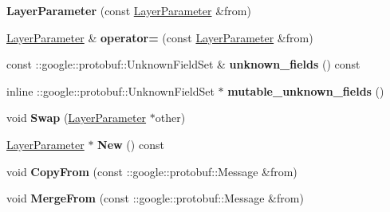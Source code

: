 \begin{DoxyCompactItemize}
\item 
\mbox{\label{classcaffe_1_1_layer_parameter_af1f2b1c82ed898f06f7652e8638287d9}} 
{\bfseries Layer\+Parameter} (const \mbox{\hyperlink{classcaffe_1_1_layer_parameter}{Layer\+Parameter}} \&from)
\item 
\mbox{\label{classcaffe_1_1_layer_parameter_ad693650b871f5ecd2e89e9626a414deb}} 
\mbox{\hyperlink{classcaffe_1_1_layer_parameter}{Layer\+Parameter}} \& {\bfseries operator=} (const \mbox{\hyperlink{classcaffe_1_1_layer_parameter}{Layer\+Parameter}} \&from)
\item 
\mbox{\label{classcaffe_1_1_layer_parameter_a672adc76180ccb213a75d4583666715d}} 
const \+::google\+::protobuf\+::\+Unknown\+Field\+Set \& {\bfseries unknown\+\_\+fields} () const
\item 
\mbox{\label{classcaffe_1_1_layer_parameter_a6b572023f9ef350f7476ba55fc4f5489}} 
inline \+::google\+::protobuf\+::\+Unknown\+Field\+Set $\ast$ {\bfseries mutable\+\_\+unknown\+\_\+fields} ()
\item 
\mbox{\label{classcaffe_1_1_layer_parameter_a24454ba17a6dbd76f98047ed7191d242}} 
void {\bfseries Swap} (\mbox{\hyperlink{classcaffe_1_1_layer_parameter}{Layer\+Parameter}} $\ast$other)
\item 
\mbox{\label{classcaffe_1_1_layer_parameter_a8b96d189adb26428efcb246375dd8b0c}} 
\mbox{\hyperlink{classcaffe_1_1_layer_parameter}{Layer\+Parameter}} $\ast$ {\bfseries New} () const
\item 
\mbox{\label{classcaffe_1_1_layer_parameter_af47289b21b23575e3ed411b13c6c2304}} 
void {\bfseries Copy\+From} (const \+::google\+::protobuf\+::\+Message \&from)
\item 
\mbox{\label{classcaffe_1_1_layer_parameter_a849a7e68e81dde0863b72aebb4adf83e}} 
void {\bfseries Merge\+From} (const \+::google\+::protobuf\+::\+Message \&from)
\item 
\mbox{\label{classcaffe_1_1_layer_parameter_a29d39d936896d253d3fd2b09ec1e53de}} 

\end{DoxyCompactItemize}
